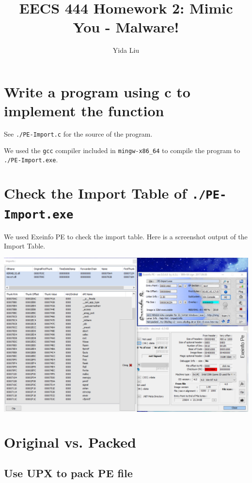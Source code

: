 \documentclass[11pt]{article}
\begin{document}
\author{Yida Liu}
\title{EECS 444 Homework 2: Mimic You - Malware!}
\maketitle


\section{Write a program using c to implement the function}

See \lstinline{./PE-Import.c} for the source of the program.

We used the \lstinline{gcc} compiler included in \lstinline{mingw-x86_64} to compile the program to \lstinline{./PE-Import.exe}.

\section{Check the Import Table of \lstinline{./PE-Import.exe}}

We used Exeinfo PE to check the import table. Here is a screenshot output of the Import Table.

\begin{center}
    \includegraphics[width=\textwidth]{Assignment/2/Q1/sc_import_table_pe.png}
\end{center}


\section{Original vs. Packed}

\subsection{Use UPX to pack PE file}
\end{document}
